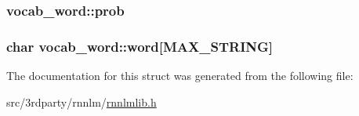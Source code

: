 \subsubsection[{prob}]{ vocab\+\_\+word\+::prob}\hypertarget{structvocab__word_a3bb8f4f7daa1a334b44f3035cc927483}{}\label{structvocab__word_a3bb8f4f7daa1a334b44f3035cc927483}
\subsubsection[{word}]{\setlength{\rightskip}{0pt plus 5cm}char vocab\+\_\+word\+::word\mbox{[}{\bf M\+A\+X\+\_\+\+S\+T\+R\+I\+NG}\mbox{]}}\hypertarget{structvocab__word_a069f94e6305a100329ca7db0c4cc6ecf}{}\label{structvocab__word_a069f94e6305a100329ca7db0c4cc6ecf}


The documentation for this struct was generated from the following file\+:\begin{DoxyCompactItemize}
\item 
src/3rdparty/rnnlm/\hyperlink{rnnlmlib_8h}{rnnlmlib.\+h}\end{DoxyCompactItemize}
